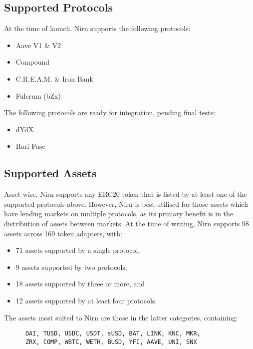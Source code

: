 \documentclass{article}
\begin{document}
\newpage
\subsection{Supported Protocols}

At the time of launch, Nirn supports the following protocols:

\begin{itemize}
\item Aave V1 \& V2
\item Compound
\item C.R.E.A.M. \& Iron Bank
\item Fulcrum (bZx)
\end{itemize}

\noindent
The following protocols are ready for integration, pending final tests:

\begin{itemize}
\item dYdX
\item Rari Fuse
\end{itemize}

\subsection{Supported Assets}

Asset-wise, Nirn supports any ERC20 token that is listed by at least one of the supported protocols above. However, Nirn is best utilised for those assets which have lending markets on multiple protocols, as its primary benefit is in the distribution of assets between markets. At the time of writing, Nirn supports 98 assets across 169 token adapters, with:

\begin{itemize}
    \item 71 assets supported by a single protocol,
    \item 9 assets supported by two protocols,
    \item 18 assets supported by three or more, and
    \item 12 assets supported by at least four protocols.
\end{itemize}

\noindent
The assets most suited to Nirn are those in the latter categories, containing:

\begin{verbatim}
      DAI, TUSD, USDC, USDT, sUSD, BAT, LINK, KNC, MKR,
      ZRX, COMP, WBTC, WETH, BUSD, YFI, AAVE, UNI, SNX
\end{verbatim}
\end{document}
